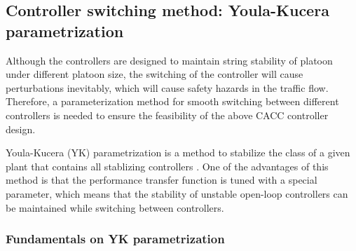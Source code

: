 \documentclass[a4paper,fleqn]{cas-sc}
\begin{document}


\subsection{Controller switching method: Youla-Kucera parametrization}
\label{Section 3.2}

Although the controllers are designed to maintain string stability of platoon under different platoon size, the switching of the controller will cause perturbations inevitably, which will cause safety hazards in the traffic flow. Therefore, a parameterization method for smooth switching between different controllers is needed to ensure the feasibility of the above CACC controller design.

Youla-Kucera (YK) parametrization is a method to stabilize the class of a given plant that contains all stablizing controllers \citep{dasgupta1996parametrization,navas2017youla}. One of the advantages of this method is that the performance transfer function is tuned with a special parameter, which means that the stability of unstable open-loop controllers can be maintained while switching between controllers.

\subsubsection{Fundamentals on YK parametrization}
\label{Section 3.2.1}
\end{document}
